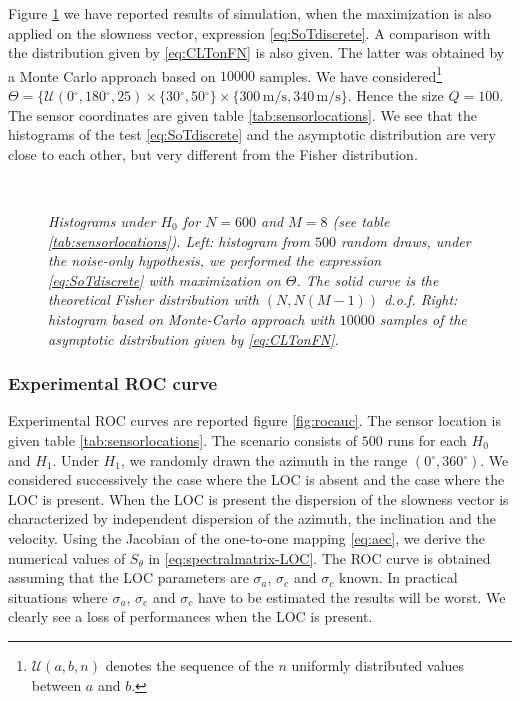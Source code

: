 \documentclass[graybox]{svmult/styles/svmult}
\def\degree{^{\circ}}
\def\degree{\ensuremath{^\circ}}
\def\linspace{\mathcal{U}}
\def\mps{\mathrm{\,m/s}}
\def\nbsamples{10000}
\newcommand{\figscale}[4]{
\begin{figure}[hbtp]
\centerline{
    \hbox{ \psfig{figure={#1}, scale=#4} }
}
\begin{center}
\parbox{12 cm}
{
    \caption{\protect\small\it  {#2}}
    \label {#3}
}
\end{center}
\end{figure}}
\begin{document}
Figure \ref{fig:simul2} we have reported results of simulation, when the maximization is also applied on the slowness vector, expression \eqref{eq:SoTdiscrete}. A comparison with the distribution given by \eqref{eq:CLTonFN} is also given. The latter was obtained by a Monte Carlo approach based on $\nbsamples$ samples. We have considered\footnote{$\linspace(a,b,n)$ denotes the sequence of the $n$ uniformly distributed values between $a$ and $b$. } $\Theta= \{ \linspace(0\degree,180\degree,25) \times\{30\degree,50\degree\} \times \{300\mps, 340\mps\}$. Hence the size $Q=100$. The sensor coordinates are given table \ref{tab:sensorlocations}. We see that the histograms of the test \eqref{eq:SoTdiscrete} and the asymptotic distribution are very close to each other, but very different from the Fisher distribution.



\figscale{figures/simul2.pdf}
{Histograms under $H_{0}$ for $N=600$ and $M=8$ (see table \ref{tab:sensorlocations}).  Left: histogram from $500$ random draws, under the noise-only hypothesis, we performed the expression \eqref{eq:SoTdiscrete} with maximization on $\Theta$. The solid curve is the theoretical Fisher distribution with $(N,N(M-1))$ d.o.f. Right: histogram based on Monte-Carlo approach with $\nbsamples$ samples of the asymptotic distribution given by \eqref{eq:CLTonFN}.}{fig:simul2}{0.55}


\subsubsection{Experimental ROC curve}
Experimental ROC curves are reported figure \ref{fig:rocauc}.  The sensor location is given table \ref{tab:sensorlocations}. The scenario consists of $500$ runs for each $H_{0}$ and $H_{1}$. Under $H_{1}$, we randomly drawn the azimuth in the range $(0\degree,360\degree)$. We considered successively the case where the LOC is absent and the case where the LOC is present. When the LOC is present the dispersion of the slowness vector is characterized by independent dispersion of the azimuth, the inclination and the velocity. Using the Jacobian of the one-to-one mapping \eqref{eq:aec}, we derive the numerical values of $S_{\theta}$ in \eqref{eq:spectralmatrix-LOC}. The ROC curve is obtained assuming that the LOC parameters are $\sigma_{a}$, $\sigma_{e}$ and $\sigma_{c}$ known. In practical situations where $\sigma_{a}$, $\sigma_{e}$ and $\sigma_{c}$ have to be estimated the results will be worst. We clearly see  a loss of performances when the LOC is present.
\end{document}
